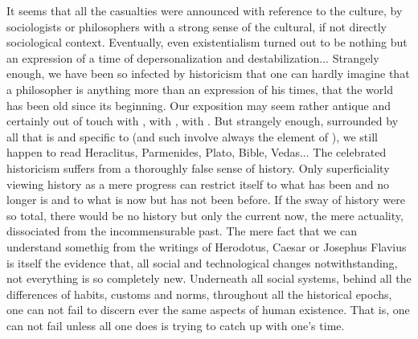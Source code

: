 It seems that all the casualties were announced with reference to the
culture, by sociologists or philosophers with a strong sense of the cultural, if
not directly sociological context. Eventually, even existentialism turned out to be
nothing but an expression of a time of depersonalization and destabilization...
Strangely enough, we have been so infected by historicism that one can hardly
imagine that a philosopher is anything more than an expression of his times,
that the world has been old since its beginning. Our exposition may seem rather antique and certainly out of touch with
, with , with .  But strangely enough, surrounded by all that is  and
specific to  (and such  involve always the element of
), we still happen to read Heraclitus, Parmenides, Plato,
Bible, Vedas... The celebrated historicism suffers from a thoroughly false sense
of history. Only superficiality viewing history as a mere progress can restrict
itself to what has been and no longer is and to what is now but has not been
before. If the sway of history were so total, there would be no history but only
the current now, the mere actuality, dissociated from the incommensurable past.
The mere fact that we can understand somethig from the writings of Herodotus,
Caesar or Josephus Flavius is itself the evidence that, all social and
technological changes notwithstanding, not everything is so completely new. 
Underneath all social systems, behind all the differences of habits, customs and
norms, throughout all the historical epochs, one can not fail to discern ever
the same aspects of human existence. That is, one can not fail unless all one
does is trying to catch up with one's time. 

